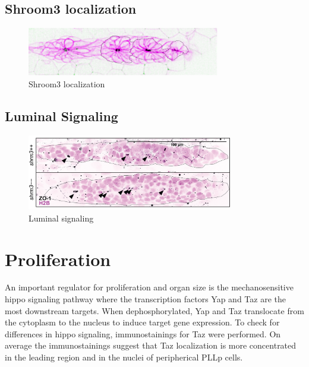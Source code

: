 \documentclass[11pt,singlespacinge,twoside]{reedthesis} %
\begin{document}
\hypertarget{shroom3-localization}{%
\subsection{Shroom3 localization}\label{shroom3-localization}}


\begin{figure}

{\centering \includegraphics[width=0.75\textwidth]{figures/supp/loc} 

}

\caption[Shroom3 localization]{Shroom3 localization}\label{fig:supploc}
\end{figure}
\hypertarget{luminal-signaling}{%
\subsection{Luminal Signaling}\label{luminal-signaling}}


\begin{figure}

{\centering \includegraphics[width=0.8\textwidth]{figures/supp/zo1} 

}

\caption[Luminal signaling]{Luminal signaling}\label{fig:suppzo1}
\end{figure}
\hypertarget{proliferation-2}{%
\section{Proliferation}\label{proliferation-2}}

An important regulator for proliferation and organ size is the mechanosensitive hippo signaling pathway where the transcription factors Yap and Taz are the most downstream targets. When dephosphorylated, Yap and Taz translocate from the cytoplasm to the nucleus to induce target gene expression.
To check for differences in hippo signaling, immunostainings for Taz were performed. On average the immunostainings suggest that Taz localization is more concentrated in the leading region and in the nuclei of peripherical PLLp cells.
\end{document}
